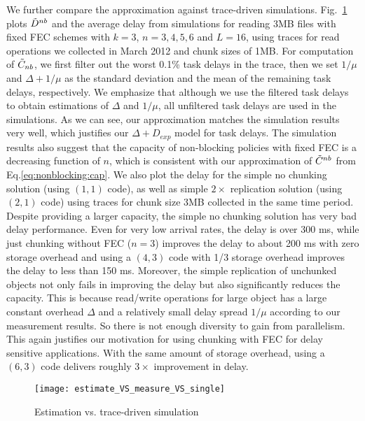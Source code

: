 \documentclass[journal]{IEEEtran}
\begin{document}
We further compare the approximation against trace-driven simulations.  Fig.~\ref{fig:estimate_VS_trace} plots $\tilde{D}^{nb}$ and the average delay from  simulations for reading 3MB files with fixed FEC schemes with $k=3$, $n=3,4,5,6$ and $L=16$, using traces for read operations we collected in March 2012 and chunk sizes of 1MB. For computation of $\tilde{C}_{nb}$, we first filter out the worst 0.1\% task delays in the trace, then we set $1/\mu$ and $\Delta + 1/\mu$ as the standard deviation and the mean of the remaining task delays, respectively. 
We emphasize that although we use the filtered task delays to obtain estimations of $\Delta$ and $1/\mu$, all unfiltered task delays are used in the simulations. 
As we can see, our approximation matches the simulation results very well, which justifies our $\Delta +D_{exp}$ model for task delays. The simulation results also suggest that the capacity of non-blocking policies with fixed FEC is a decreasing function of $n$, which is consistent with our approximation of $\tilde{C}^{nb}$ from Eq.\ref{eq:nonblocking:cap}. We also plot the delay for the simple no chunking solution (using $(1,1)$ code), as well as simple $2\times$ replication solution (using $(2,1)$ code) using traces for  chunk size 3MB collected in the same time period. Despite providing a larger capacity, the simple no chunking solution has very bad delay performance. Even for very low arrival rates, the delay is over 300 ms, while just chunking without FEC ($n=3$) improves the delay to about 200 ms with zero storage overhead and using a $(4,3)$ code with 1/3 storage overhead improves the delay to less than 150 ms. Moreover, the simple replication of unchunked objects not only fails in improving the delay but also significantly reduces the capacity.
This is because read/write operations for large object has a large constant overhead $\Delta$ and a relatively small delay spread $1/\mu$ according to our measurement results. So there is not enough diversity to gain from parallelism.
This again justifies our motivation for using chunking with FEC for delay sensitive applications. With the same amount of storage overhead, using a $(6,3)$ code delivers roughly $3\times$ improvement in delay.

\begin{figure}[t]
\centering
\texttt{[image: estimate\_VS\_measure\_VS\_single]}
\vspace{-10pt}
\caption{Estimation vs.  trace-driven simulation}
\label{fig:estimate_VS_trace}
\vspace{-10pt}
\end{figure}
\end{document}
